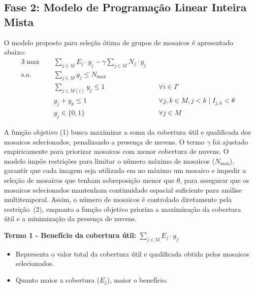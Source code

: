 \documentclass[a4paper,11pt]{article}
\begin{document}
\subsection{Fase 2: Modelo de Programação Linear Inteira Mista}\label{sec:fase2}
O modelo proposto para seleção ótima de grupos de mosaicos é apresentado abaixo:
\vspace{-1mm}
\begin{alignat}{3}
    \max \quad & \sum_{j \in M} E_j \cdot y_j - \gamma \sum_{j \in M} N_j \cdot y_j & \tag{1} \\
    \text{s.a.} \quad & \sum_{j \in M} y_j \leq N_{\max} & \tag{2} \\
    & \sum_{j \in M(i)} y_j \leq 1 & \quad \forall i \in I' \tag{3}\\
    & y_j + y_k \leq 1 & \quad \forall j, k \in M, j < k \mid I_{j,k} < \theta \tag{4}\\
    & y_j \in \{0,1\} & \quad \forall j \in M \tag{5}
\end{alignat}

\vspace{-2mm}
A função objetivo (1) busca maximizar a soma da cobertura útil e qualificada dos mosaicos selecionados, penalizando a presença de nuvens. O termo $\gamma$ foi ajustado empiricamente para priorizar mosaicos com menor cobertura de nuvens. O modelo impõe restrições para limitar o número máximo de mosaicos ($N_{\max}$), garantir que cada imagem seja utilizada em no máximo um mosaico e impedir a seleção de mosaicos que tenham sobreposição menor que $\theta$, para assegurar que os mosaicos selecionados mantenham continuidade espacial suficiente para análise multitemporal. Assim, o número de mosaicos é controlado diretamente pela restrição~(2), enquanto a função objetivo prioriza a maximização da cobertura útil e a minimização da presença de nuvens.

\textbf{Termo 1 - Benefício da cobertura útil:} $\sum_{j \in M} E_j \cdot y_j$
\begin{itemize}[noitemsep, topsep=0pt]
    \item Representa o valor total da cobertura útil e qualificada obtida pelos mosaicos selecionados.
    \item Quanto maior a cobertura ($E_j$), maior o benefício.
\end{itemize}
\end{document}
